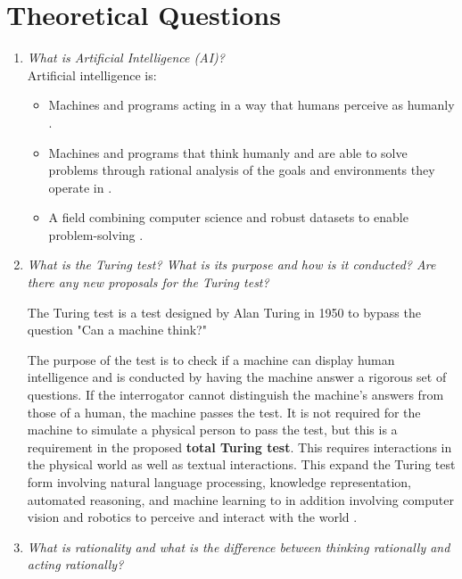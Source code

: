 \section*{Theoretical Questions}

\begin{enumerate}
    \item \textit{What is Artificial Intelligence (AI)?} \\
    
    Artificial intelligence is: 

    \begin{itemize}
        \item Machines and programs acting in a way that humans perceive as humanly \cite{aima}.
        \item Machines and programs that think humanly and are able to solve problems through rational analysis of the goals and environments they operate in \cite{aima}. 
        \item A field combining computer science and robust datasets to enable problem-solving \cite{ibm}.
    \end{itemize}
    
    \item \textit{What is the Turing test? What is its purpose and how is it conducted? Are there any new proposals for the Turing test?} 

    The Turing test is a test designed by Alan Turing in 1950 to bypass the question "Can a machine think?" 

    The purpose of the test is to check if a machine can display human intelligence and is conducted by having the machine answer a rigorous set of questions. If the interrogator cannot distinguish the machine's answers from those of a human, the machine passes the test. It is not required for the machine to simulate a physical person to pass the test, but this is a requirement in the proposed \textbf{total Turing test}. This requires interactions in the physical world as well as textual interactions. This expand the Turing test form involving natural language processing, knowledge representation, automated reasoning, and machine learning to in addition involving computer vision and robotics to perceive and interact with the world \cite{aima}. \\
    
    \item \textit{What is rationality and what is the difference between thinking rationally and acting rationally?} 
    

\end{enumerate}
